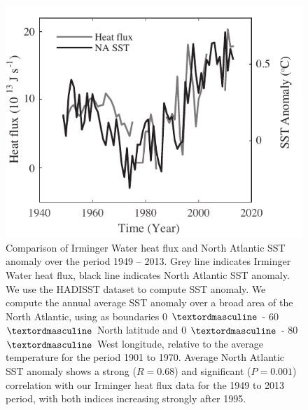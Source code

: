 \clearpage
\begin{figure}
	\centering
	\includegraphics{figs_app/FigS2.pdf}
	\caption[Comparison of Irminger Water heat flux and North Atlantic SST anomaly over the period 1949 – 2013]{Comparison of Irminger Water heat flux and North Atlantic SST anomaly over the period 1949 – 2013.  Grey line indicates Irminger Water heat flux, black line indicates North Atlantic SST anomaly.  We use the HADISST dataset to compute SST anomaly.  We compute the annual average SST anomaly over a broad area of the North Atlantic, using as boundaries 0 $\textordmasculine$ - 60 $\textordmasculine$ North latitude and 0 $\textordmasculine$ - 80 $\textordmasculine$ West longitude, relative to the average temperature for the period 1901 to 1970.  Average North Atlantic SST anomaly shows a strong ($R=0.68$) and significant ($P=0.001$) correlation with our Irminger heat flux data for the 1949 to 2013 period, with both indices increasing strongly after 1995.}
	\label{fig:SI4_fig2}
\end{figure}


